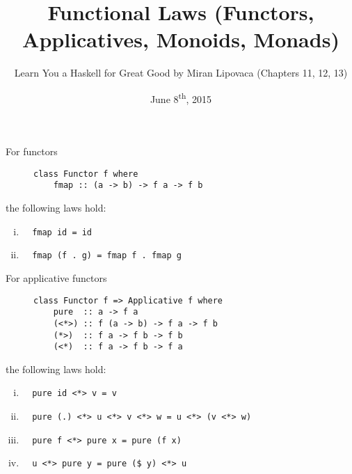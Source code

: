 \documentclass[a4paper,8pt]{article}
\title{Functional Laws (Functors, Applicatives, Monoids, Monads)}
\author{Learn You a Haskell for Great Good by Miran Lipovaca (Chapters 11, 12, 13)}
\date{June 8\textsuperscript{th}, 2015}
\begin{document}
\maketitle
{}

\begin{outline}

    For functors
    \begin{figure}[thp]
      \centering
      \begin{minipage}{0.4\textwidth}
        \begin{verbatim}
class Functor f where
    fmap :: (a -> b) -> f a -> f b
        \end{verbatim}
      \end{minipage}
    \end{figure}

    the following laws hold:
    \begin{enumerate}[i.]
      \item
        \begin{verbatim}
  fmap id = id
        \end{verbatim}
      \item
        \begin{verbatim}
  fmap (f . g) = fmap f . fmap g
        \end{verbatim}
    \end{enumerate}

    For applicative functors
    \begin{figure}[thp]
      \centering
      \begin{minipage}{0.4\textwidth}
        \begin{verbatim}
class Functor f => Applicative f where
    pure  :: a -> f a
    (<*>) :: f (a -> b) -> f a -> f b
    (*>)  :: f a -> f b -> f b
    (<*)  :: f a -> f b -> f a
        \end{verbatim}
      \end{minipage}
    \end{figure}

    the following laws hold:
    \begin{enumerate}[i.]
      \item
        \begin{verbatim}
  pure id <*> v = v
        \end{verbatim}
      \item
        \begin{verbatim}
  pure (.) <*> u <*> v <*> w = u <*> (v <*> w)
        \end{verbatim}
      \item
        \begin{verbatim}
  pure f <*> pure x = pure (f x)
        \end{verbatim}
      \item
        \begin{verbatim}
  u <*> pure y = pure ($ y) <*> u
        \end{verbatim}
    \end{enumerate}


\end{outline}
\end{document}
